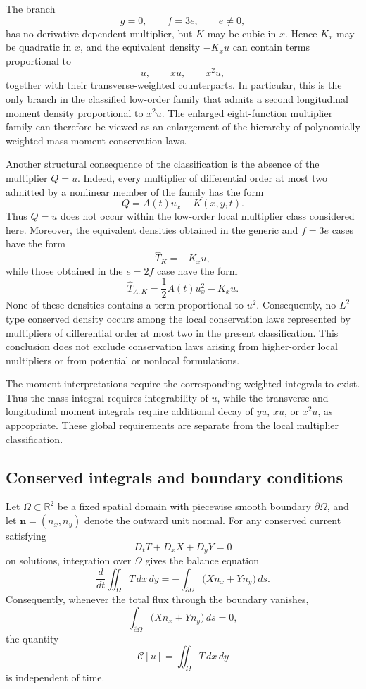 \documentclass[11pt]{article}
\numberwithin{equation}{section}
\theoremstyle{definition}
\theoremstyle{remark}
\begin{document}
The branch
\[
g=0,
\qquad
f=3e,
\qquad
e\neq0,
\]
has no derivative-dependent multiplier, but $K$ may be cubic in
$x$. Hence $K_x$ may be quadratic in $x$, and the equivalent density
$-K_xu$ can contain terms proportional to
\[
u,
\qquad
xu,
\qquad
x^2u,
\]
together with their transverse-weighted counterparts. In particular,
this is the only branch in the classified low-order family that
admits a second longitudinal moment density proportional to $x^2u$.
The enlarged eight-function multiplier family can therefore be
viewed as an enlargement of the hierarchy of polynomially weighted
mass-moment conservation laws.

Another structural consequence of the classification is the absence
of the multiplier $Q=u$. Indeed, every multiplier of differential
order at most two admitted by a nonlinear member of the family has
the form
\[
Q=A(t)u_x+K(x,y,t).
\]
Thus $Q=u$ does not occur within the low-order local multiplier class
considered here. Moreover, the equivalent densities obtained in the
generic and $f=3e$ cases have the form
\[
\widehat{T}_K=-K_xu,
\]
while those obtained in the $e=2f$ case have the form
\[
\widehat{T}_{A,K}
=
\frac12A(t)u_x^2-K_xu.
\]
None of these densities contains a term proportional to $u^2$.
Consequently, no $L^2$-type conserved density occurs among the local
conservation laws represented by multipliers of differential order
at most two in the present classification. This conclusion does not
exclude conservation laws arising from higher-order local
multipliers or from potential or nonlocal formulations.

The moment interpretations require the corresponding weighted
integrals to exist. Thus the mass integral requires integrability of
$u$, while the transverse and longitudinal moment integrals require
additional decay of $yu$, $xu$, or $x^2u$, as appropriate. These
global requirements are separate from the local multiplier
classification.
\subsection{Conserved integrals and boundary conditions}
\label{subsec:conserved-integrals}
Let $\Omega\subset\mathbb{R}^2$ be a fixed spatial domain with
piecewise smooth boundary $\partial\Omega$, and let
$\boldsymbol{n}=(n_x,n_y)$ denote the outward unit normal. For any
conserved current satisfying
\begin{equation*}
D_tT+D_xX+D_yY=0
\end{equation*}
on solutions, integration over $\Omega$ gives the balance equation
\begin{equation}
\frac{d}{dt}
\iint_{\Omega}T\,dx\,dy
=
-\int_{\partial\Omega}
\bigl(Xn_x+Yn_y\bigr)\,ds.
\label{eq:global-balance}
\end{equation}
Consequently, whenever the total flux through the boundary vanishes,
\begin{equation*}
\int_{\partial\Omega}
\bigl(Xn_x+Yn_y\bigr)\,ds=0,
\end{equation*}
the quantity
\begin{equation}
\mathcal{C}[u]
=
\iint_{\Omega}T\,dx\,dy
\label{eq:conserved-integral}
\end{equation}
is independent of time.
\end{document}
